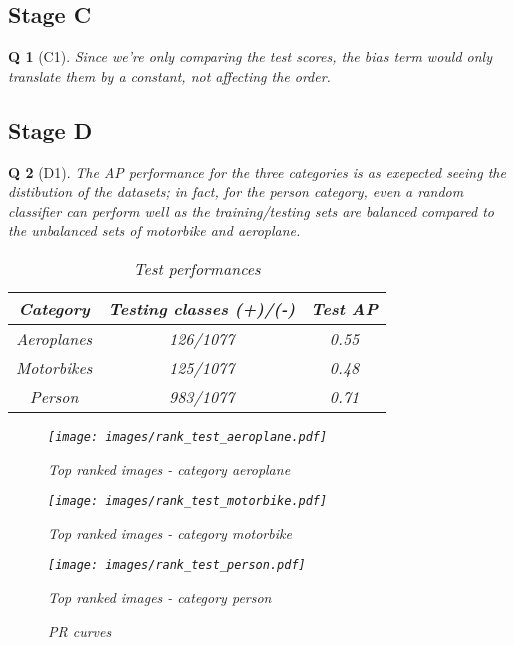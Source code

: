\documentclass[11pt]{article}
\theoremstyle{exo}
\newtheorem*{exercise}{Q}
\newcommand{\1}{\mathbf{1}}
\newcommand{\0}{\mathbf{0}}
\begin{document}
\subsection*{Stage C}
\begin{exercise}[C1]
	Since we're only comparing the test scores, the bias term would only translate them by a constant, not affecting the order.
\end{exercise}

\subsection*{Stage D}
\begin{exercise}[D1]
	The AP performance for the three categories is as exepected seeing the distibution of the datasets; in fact, for the \textit{person} category, even a random classifier can perform well as the training/testing sets are balanced compared to the unbalanced sets of \textit{motorbike} and \textit{aeroplane}.
	\begin{table}
	\centering
	\caption{Test performances}
	\begin{tabular}{||c|c|c||}
	\hline
	Category & Testing classes (+)/(-) & Test AP\\
	\hline
	Aeroplanes & 126/1077 &0.55\\
	Motorbikes & 125/1077 & 0.48\\
	Person & 983/1077 &0.71\\
	\hline
	\end{tabular}
	\end{table}

	\begin{figure}[H]
	\centering
	\caption{Top ranked images - category \textit{aeroplane}}
	\texttt{[image: images/rank\_test\_aeroplane.pdf]}
	\end{figure}


	\begin{figure}[H]
	\centering
	\caption{Top ranked images - category \textit{motorbike}}
	\texttt{[image: images/rank\_test\_motorbike.pdf]}
	\end{figure}

	\begin{figure}[H]
	\centering
	\caption{Top ranked images - category \textit{person}}
	\texttt{[image: images/rank\_test\_person.pdf]}
	\end{figure}


	\begin{figure}[H]
	\centering
	\caption{PR curves}
	\end{figure}
\end{exercise}
\end{document}
